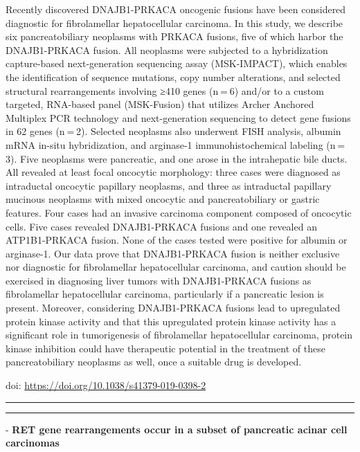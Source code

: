 \documentclass[
]{article}
\begin{document}
Recently discovered DNAJB1-PRKACA oncogenic fusions have been considered
diagnostic for fibrolamellar hepatocellular carcinoma. In this study, we
describe six pancreatobiliary neoplasms with PRKACA fusions, five of
which harbor the DNAJB1-PRKACA fusion. All neoplasms were subjected to a
hybridization capture-based next-generation sequencing assay
(MSK-IMPACT), which enables the identification of sequence mutations,
copy number alterations, and selected structural rearrangements
involving ≥410 genes (n = 6) and/or to a custom targeted, RNA-based
panel (MSK-Fusion) that utilizes Archer Anchored Multiplex PCR
technology and next-generation sequencing to detect gene fusions in 62
genes (n = 2). Selected neoplasms also underwent FISH analysis, albumin
mRNA in-situ hybridization, and arginase-1 immunohistochemical labeling
(n = 3). Five neoplasms were pancreatic, and one arose in the
intrahepatic bile ducts. All revealed at least focal oncocytic
morphology: three cases were diagnosed as intraductal oncocytic
papillary neoplasms, and three as intraductal papillary mucinous
neoplasms with mixed oncocytic and pancreatobiliary or gastric features.
Four cases had an invasive carcinoma component composed of oncocytic
cells. Five cases revealed DNAJB1-PRKACA fusions and one revealed an
ATP1B1-PRKACA fusion. None of the cases tested were positive for albumin
or arginase-1. Our data prove that DNAJB1-PRKACA fusion is neither
exclusive nor diagnostic for fibrolamellar hepatocellular carcinoma, and
caution should be exercised in diagnosing liver tumors with
DNAJB1-PRKACA fusions as fibrolamellar hepatocellular carcinoma,
particularly if a pancreatic lesion is present. Moreover, considering
DNAJB1-PRKACA fusions lead to upregulated protein kinase activity and
that this upregulated protein kinase activity has a significant role in
tumorigenesis of fibrolamellar hepatocellular carcinoma, protein kinase
inhibition could have therapeutic potential in the treatment of these
pancreatobiliary neoplasms as well, once a suitable drug is developed.

doi: \url{https://doi.org/10.1038/s41379-019-0398-2}

\begin{center}\rule{0.5\linewidth}{0.5pt}\end{center}

\begin{center}\rule{0.5\linewidth}{0.5pt}\end{center}

- \textbf{RET gene rearrangements occur in a subset of pancreatic acinar
cell carcinomas}
\end{document}
